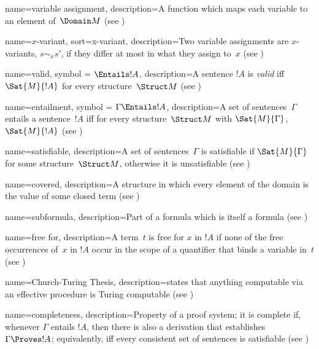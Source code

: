  {
  name=variable assignment,  
  description={A \gls{function} which maps each {variable} to an element
    of~$\Domain M$ (see )} }

 {
  name=$x$-variant,
  sort={x-variant},
  description={Two \glspl{variable assignment} are $x$-variants, $s \sim_x
    s'$, if they differ at most in what they assign to~$x$ (see
    )} }

 {
  name=valid,
  symbol = {\ensuremath{\Entails !A}},
  description={A sentence $!A$ is \emph{valid}  iff
    $\Sat{M}{!A}$ for every \gls{structure}~$\Struct M$ (see
    )} }

 {
  name=entailment,
  symbol = {\ensuremath{\Gamma \Entails !A}},
  description={A set of sentences~$\Gamma$ entails a
    sentence~$!A$ iff for every
    \gls{structure}~$\Struct M$ with $\Sat{M}{\Gamma}$, $\Sat{M}{!A}$
    (see )} }

 {
  name=satisfiable,
  description={A set of sentences~$\Gamma$ is satisfiable if
    $\Sat{M}{\Gamma}$ for some \gls{structure}~$\Struct M$, otherwise it
    is unsatisfiable (see )} }

 {
    name=covered,    
    description={A \gls{structure} in which every element of the
      domain is the {value} of some closed term (see
      )} }

 {
  name={subformula},  
  description={Part of a formula which is itself a formula (see
    )} }

 {
  name=free for,
  description={A term~$t$ is {free for} $x$ in $!A$ if none
    of the \gls{free} occurrences of~$x$ in $!A$ occur in the scope of a
    quantifier that binds a variable in~$t$ (see
    )} }

 {
  name=Church-Turing Thesis,
  description={states that anything computable via an effective
    procedure is Turing computable (see )} }

 {
  name=completeness, 
  description={Property of a proof system; it is complete if, whenever
    $\Gamma$ entails $!A$, then there is also a {derivation} that
    establishes $\Gamma \Proves !A$; equivalently, iff
    every \gls{consistent} set of sentences is \gls{satisfiable}
    (see )} }

